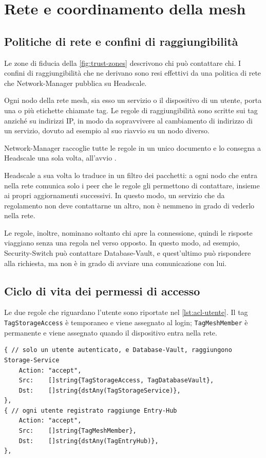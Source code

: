 \chapter{Rete e coordinamento della mesh}
\label{chap:rete}

\section{Politiche di rete e confini di raggiungibilità}

Le zone di fiducia della \autoref{fig:trust-zones} descrivono chi può contattare chi. I confini di raggiungibilità
che ne derivano sono resi effettivi da una politica di rete che Network-Manager pubblica su Headscale.

Ogni nodo della rete mesh, sia esso un servizio o il dispositivo di un utente, porta una o più etichette
chiamate tag. Le regole di raggiungibilità sono scritte sui tag anziché su indirizzi IP, in modo da 
sopravvivere al cambiamento di indirizzo di un servizio, dovuto ad esempio al suo riavvio su un nodo diverso.

Network-Manager raccoglie tutte le regole in un unico documento e lo consegna a Headscale una sola volta,
all'avvio \cite{ramusb-code-acl-policy}. 

Headscale a sua volta lo traduce in un filtro dei pacchetti: a ogni nodo che entra nella rete comunica solo i
peer che le regole gli permettono di contattare, insieme ai propri aggiornamenti successivi.
In questo modo, un servizio che da regolamento non deve contattarne un altro, non è nemmeno in grado di 
vederlo nella rete.

Le regole, inoltre, nominano soltanto chi apre la connessione, quindi le risposte viaggiano senza una regola 
nel verso opposto. In questo modo, ad esempio, Security-Switch può contattare Database-Vault, e quest'ultimo 
può rispondere alla richiesta, ma non è in grado di avviare una comunicazione con lui. 

\section{Ciclo di vita dei permessi di accesso}

Le due regole che riguardano l'utente sono riportate nel \autoref{lst:acl-utente}. Il tag 
\texttt{TagStorageAccess} è temporaneo e viene assegnato al login; \texttt{TagMeshMember} è permanente e 
viene assegnato quando il dispositivo entra nella rete.

\begin{lstlisting}[caption={Le due regole che delimitano le zone dell'utente, da \texttt{policy.go}
\cite{ramusb-code-acl-policy}, con commenti aggiunti.}, label={lst:acl-utente}]
{ // solo un utente autenticato, e Database-Vault, raggiungono Storage-Service
    Action: "accept",
    Src:    []string{TagStorageAccess, TagDatabaseVault},
    Dst:    []string{dstAny(TagStorageService)},
},
{ // ogni utente registrato raggiunge Entry-Hub
    Action: "accept",
    Src:    []string{TagMeshMember},
    Dst:    []string{dstAny(TagEntryHub)},
},
\end{lstlisting}

